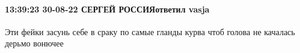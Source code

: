  
 
 
 
 

\paragraph{13:39:23 30-08-22 СЕРГЕЙ РОССИЯответил vasja}

Эти фейки засунь себе в сраку по самые гланды курва чтоб голова не качалась
дерьмо вонючее
